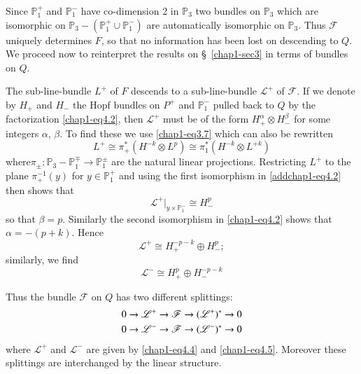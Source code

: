 Since $\mathbb{P}^{+}_{1}$ and $\mathbb{P}^{-}_{1}$ have co-dimension
2 in $\mathbb{P}_{3}$ two bundles on $\mathbb{P}_{3}$ which are
isomorphic on $\mathbb{P}_{3}-(\mathbb{P}^{+}_{1}\cup
\mathbb{P}^{-}_{1})$ are automatically isomorphic on
$\mathbb{P}_{3}$. Thus $\mathscr{F}$ uniquely determines $F$, so that
no information has been lost on descending to $Q$. We proceed now to
reinterpret the results on \S\ \ref{chap1-sec3} in terms of bundles on
$Q$. 

The sub-line-bundle $L^{+}$ of $F$ descends to a sub-line-bundle
$\mathscr{L}^{+}$ of $\mathscr{F}$. If we denote by $H_{+}$ and
$H_{-}$ the Hopf bundles on $P^{+}$ and $\mathbb{P}^{-}_{1}$ pulled
back to $Q$ by the factorization \eqref{chap1-eq4.2}, then
$\mathscr{L}^{+}$ must be of the form $H^{\alpha}_{+}\otimes
H^{\beta}_{-}$ for some integers $\alpha$, $\beta$. 
To find these we use \eqref{chap1-eq3.7} which can also be rewritten
\setcounter{equation}{1}
\begin{equation}
L^{+}\cong \pi^{*}_{+}(H^{-k}\otimes L^{p})\cong
\pi^{*}_{1}(H^{-k}\otimes L^{+k})\label{addchap1-eq4.2} 
\end{equation}
where\pageoriginale $\pi_{\pm}:\mathbb{P}_{3}-\mathbb{P}^{\mp}_{1}\to
\mathbb{P}^{\pm}_{1}$ are the natural linear projections. Restricting
$L^{+}$ to the plane $\pi^{-1}_{+}(y)$ for $y\in \mathbb{P}^{+}_{1}$
and using the first isomorphism in \eqref{addchap1-eq4.2} then shows that
\begin{equation}
\mathscr{L}^{+}|_{y\times \mathbb{P}_{1}^{-}}\cong
H^{p}_{-}\label{chap1-eq4.3} 
\end{equation}
so that $\beta=p$. Similarly the second isomorphism in
\eqref{chap1-eq4.2} shows that $\alpha=-(p+k)$. Hence
\begin{equation}
\mathscr{L}^{+}\cong H^{-p-k}_{+}\oplus H^{p}_{-};\label{chap1-eq4.4}
\end{equation}
similarly, we find
\begin{equation}
\mathscr{L}^{-}\cong H^{p}_{+}\oplus H^{-p-k}_{-}\label{chap1-eq4.5}
\end{equation}

Thus the bundle $\mathscr{F}$ on $Q$ has two different splittings:
\begin{align}
& 0\to \mathscr{L}^{+}\to \mathscr{F}\to (\mathscr{L}^{+})^{*}\to
  0\notag\\
& 0\to \mathscr{L}^{-}\to \mathscr{F}\to (\mathscr{L}^{-})^{*}\to
  0\label{chap1-eq4.6} 
\end{align}
where $\mathscr{L}^{+}$ and $\mathscr{L}^{-}$ are given by
\eqref{chap1-eq4.4} and \eqref{chap1-eq4.5}. Moreover these splittings
are interchanged by the linear structure.

